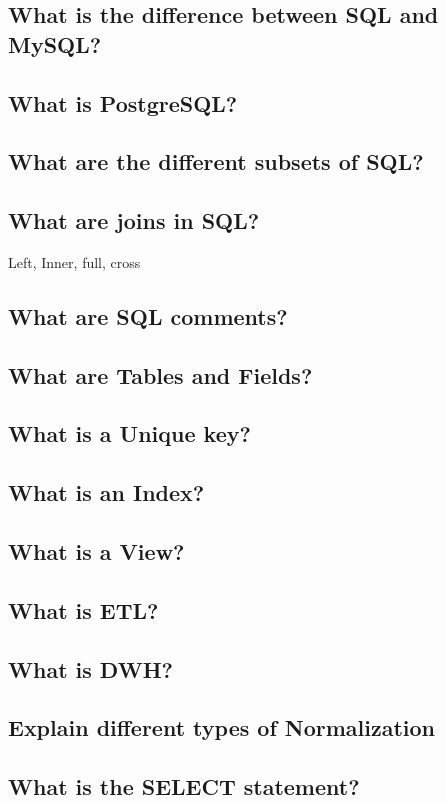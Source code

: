 \documentclass[12pt, a4paper, oneside]{article}
\begin{document}
\subsection{ What is the difference between SQL and MySQL?  }
\subsection{ What is PostgreSQL? }
\subsection{ What are the different subsets of SQL? }
\subsection{ What are joins in SQL? }
Left, Inner, full, cross
\subsection{ What are SQL comments? }

\subsection{ What are Tables and Fields? }
\subsection{ What is a Unique key? }
\subsection{ What is an Index? }
\subsection{ What is a View? }
\subsection{ What is ETL? }
\subsection{ What is DWH? }
\subsection{ Explain different types of Normalization }
\subsection{ What is the SELECT statement? }
\end{document}
